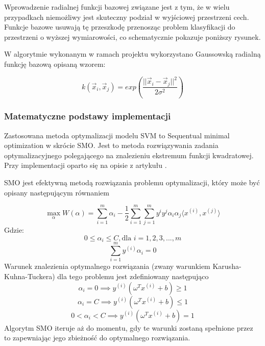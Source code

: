 \documentclass[[10pt,a4paper]{article}
\begin{document}
Wprowadzenie radialnej funkcji bazowej związane jest z tym, że w wielu przypadkach niemożliwy jest skuteczny podział w wyjściowej przestrzeni cech. Funkcje bazowe usuwają tę przeszkodę przenosząc problem klasyfikacji do przestrzeni o wyższej wymiarowości, co schematycznie pokazuje poniższy rysunek.

W algorytmie wykonanym w ramach projektu wykorzystano Gaussowską radialną funkcję bazową opisaną wzorem:

\begin{equation}
k(\vec{x}_i,\vec{x}_j) = exp(\frac{||\vec{x}_i-\vec{x}_j||^2}{2\sigma^2})
\end{equation}
\subsubsection{Matematyczne podstawy implementacji}

Zastosowana metoda optymalizacji modelu SVM to Sequentual minimal optimization w skrócie SMO. Jest to metoda rozwiązywania zadania optymalizacyjnego polegającego na znalezieniu ekstremum funkcji kwadratowej. Przy implementacji oparto się na opisie z artykułu \cite{svmsmo}. 

SMO jest efektywną metodą rozwiązania problemu optymalizacji, który może być opisany następującym równaniem

\begin{equation}
\max_{\alpha} W(\alpha) = \sum_{i=1}^{m}\alpha_i - \frac{1}{2}\sum_{i=1}^{m}\sum_{j=1}^{m}y^{i}y^{j}\alpha_i\alpha_j\langle x^{(i)},x^{(j)}\rangle
\end{equation}
Gdzie:
\begin{equation}
0\leq \alpha_i \leq C, \text{dla } i = 1, 2, 3, ..., m
\end{equation}
\begin{equation}
	\sum_{i=1}^{m}y^{(i)}\alpha_i=0
\end{equation}
Warunek znalezienia optymalnego rozwiązania (zwany warunkiem Karusha-Kuhna-Tuckera) dla tego problemu jest zdefiniowany następująco
\begin{equation}
\alpha_i = 0 \implies y^{(i)}(\omega^{T}x^{(i)}+b)\geq1
\end{equation}
\begin{equation}
\alpha_i = C \implies y^{(i)}(\omega^{T}x^{(i)}+b)\leq1
\end{equation}
\begin{equation}
0 < \alpha_i < C \implies y^{(i)}(\omega^{T}x^{(i)}+b)= 1
\end{equation}
Algorytm SMO iteruje aż do momentu, gdy te warunki zostaną spełnione przez to zapewniając jego zbieżność do optymalnego rozwiązania.
\end{document}
